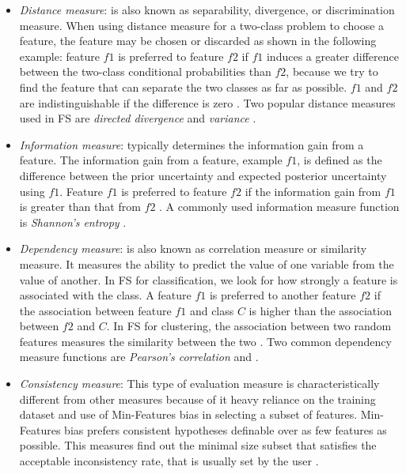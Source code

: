 \begin{itemize}
  \item \textit{Distance measure}: is also known as separability, divergence, or discrimination measure. When using distance measure for a two-class problem to choose a feature, the feature may be chosen or discarded as shown in the following example: feature $f1$ is preferred to feature $f2$ if $f1$ induces a greater difference between the two-class conditional probabilities than $f2$, because we try to find the feature that can separate the two classes as far as possible. $f1$ and $f2$ are indistinguishable if the difference is zero \citep{liu2005toward}. Two popular distance measures used in FS are \textit{directed divergence} and \textit{variance} \citep{de2015feature}.
  \item \textit{Information measure}: typically determines the information gain from a feature. The information gain from a feature, example $f1$, is defined as the difference between the prior uncertainty and expected posterior uncertainty using $f1$. Feature $f1$ is preferred to feature $f2$ if the information gain from $f1$ is greater than that from $f2$ \citep{liu2005toward}. A commonly used information measure function is \textit{Shannon’s entropy} \citep{de2015feature}.
  \item \textit{Dependency measure}: is also known as correlation measure or similarity measure. It measures the ability to predict the value of one variable from the value of another. In FS for classification, we look for how strongly a feature is associated with the class. A feature $f1$ is preferred to another feature $f2$ if the association between feature $f1$ and class $C$ is higher than the association between $f2$ and $C$. In FS for clustering, the association between two random features measures the similarity between the two \citep{liu2005toward}. Two common dependency measure functions are \textit{Pearson's correlation} and \citep{de2015feature}.
  \item \textit{Consistency measure}: This type of evaluation measure is characteristically different from other measures because of it heavy reliance on the training dataset and use of Min-Features bias in selecting a subset of features. Min-Features bias prefers consistent hypotheses definable over as few features as possible. This measures find out the minimal size subset that satisfies the acceptable inconsistency rate, that is usually set by the user \citep{liu2005toward}.
\end{itemize}

